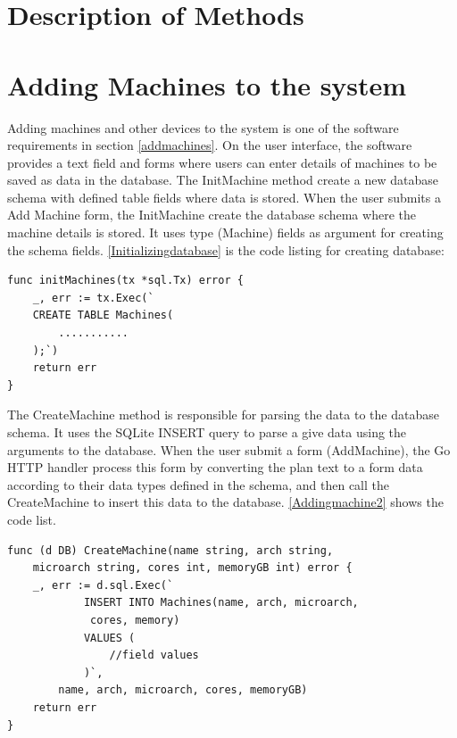 \section{Description of Methods}
\section*{Adding Machines to the system}
Adding machines and other devices to the system is one of the software requirements in section \ref{addmachines}. On the user interface, the software provides a text field and forms where users can enter details of machines to be saved as data in the database. The InitMachine method create a new database schema with defined table fields where data is stored. When the user submits a Add Machine form, the InitMachine create the database schema where the machine details is stored. It uses type (Machine) fields as argument for creating the schema fields. \autoref{Initializingdatabase} is the code listing for creating database:
\lstset{basicstyle=\footnotesize\ttfamily,breaklines=true}
\lstset{framextopmargin=50pt,frame=bottomline}
\begin{lstlisting}[caption=Creating Database for machine, label=Initializingdatabase]
func initMachines(tx *sql.Tx) error {
	_, err := tx.Exec(`
	CREATE TABLE Machines(
		...........
	);`)
	return err
}
\end{lstlisting}
The CreateMachine method is responsible for parsing the data to the database schema. It uses the SQLite INSERT query to parse a give data using the arguments to the database. When the user submit a form (AddMachine), the Go HTTP handler process this form by converting the plan text to a form data according to their data types defined in the schema, and then call the CreateMachine to insert this data to the database. \autoref{Addingmachine2} shows the code list.
\begin{lstlisting}[caption=Adding machines details, label=Addingmachine2]
func (d DB) CreateMachine(name string, arch string,
	microarch string, cores int, memoryGB int) error {
	_, err := d.sql.Exec(`
			INSERT INTO Machines(name, arch, microarch,
			 cores, memory)
			VALUES (
				//field values
			)`,
		name, arch, microarch, cores, memoryGB)
	return err
}
\end{lstlisting}

